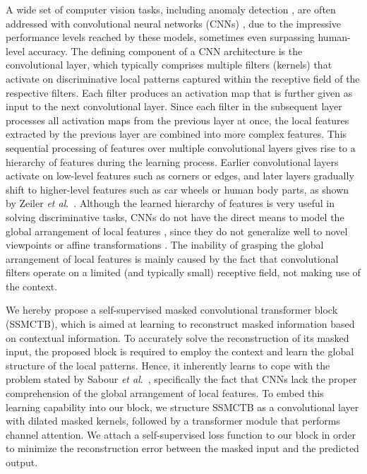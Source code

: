 \documentclass[10pt,journal,compsoc]{IEEEtran}
\newcommand{\etal}{\textit{et al}.}
\begin{document}
A wide set of computer vision tasks, including anomaly detection \cite{Georgescu-TPAMI-2021,Guo-Arxiv-2021,Li-CVPR-2021,Liu-ICCV-2021,Park-CVPR-2020}, are often addressed with convolutional neural networks (CNNs) \cite{lecun-bottou-ieee-1998,Hinton-NIPS-2012}, due to the impressive performance levels reached by these models, sometimes even surpassing human-level accuracy. The defining component of a CNN architecture is the convolutional layer, which typically comprises multiple filters (kernels) that activate on discriminative local patterns captured within the receptive field of the respective filters. Each filter produces an activation map that is further given as input to the next convolutional layer. Since each filter in the subsequent layer processes all activation maps from the previous layer at once, the local features extracted by the previous layer are combined into more complex features. This sequential processing of features over multiple convolutional layers gives rise to a hierarchy of features during the learning process. Earlier convolutional layers activate on low-level features such as corners or edges, and later layers gradually shift to higher-level features such as car wheels or human body parts, as shown by Zeiler \etal~\cite{Zeiler-ECCV-2014}. Although the learned hierarchy of features is very useful in solving discriminative tasks, CNNs do not have the direct means to model the global arrangement of local features \cite{Sabour-NIPS-2017}, since they do not generalize well to novel viewpoints or affine transformations \cite{Sandru-arXiv-2022}. The inability of grasping the global arrangement of local features is mainly caused by the fact that convolutional filters operate on a limited (and typically small) receptive field, not making use of the context.

We hereby propose a self-supervised masked convolutional transformer block (SSMCTB), which is aimed at learning to reconstruct masked information based on contextual information. To accurately solve the reconstruction of its masked input, the proposed block is required to employ the context and learn the global structure of the local patterns. Hence, it inherently learns to cope with the problem stated by Sabour \etal~\cite{Sabour-NIPS-2017}, specifically the fact that CNNs lack the proper comprehension of the global arrangement of local features. To embed this learning capability into our block, we structure SSMCTB as a convolutional layer with dilated masked kernels, followed by a transformer module that performs channel attention. We attach a self-supervised loss function to our block in order to minimize the reconstruction error between the masked input and the predicted output. 
\end{document}
